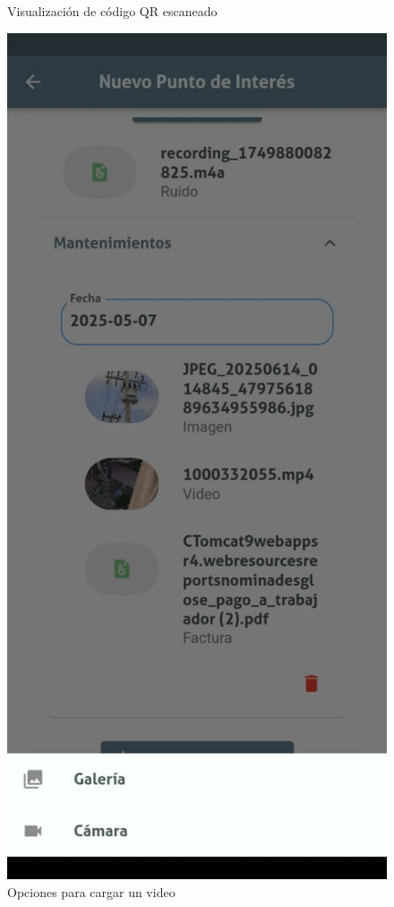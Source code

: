 \documentclass{article}
\begin{document}
\begin{figure}[H]
\begin{minipage}[b]{0.3\textwidth}
    \caption{Visualización de código QR escaneado}
    \label{fig:medias2}
  \end{minipage}
  \hspace{0.02\textwidth}
  \begin{minipage}[b]{0.3\textwidth}
    \centering
    \includegraphics[width=\textwidth]{images/functionality_test/medias_3.jpg}
    \caption{Opciones para cargar un video}
    \label{fig:medias3}
  \end{minipage}
\end{figure}
\end{document}

